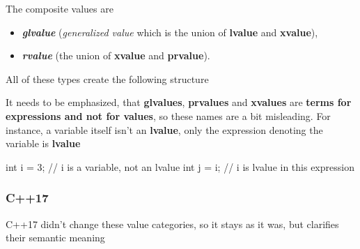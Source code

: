 \documentclass[../main]{subfiles}
\begin{document}
    The composite values are
\begin{itemize}
    \item \textbf{\textit{glvalue}} (\textit{generalized value} which is the union of \textbf{lvalue} and \textbf{xvalue}),
    \item \textbf{\textit{rvalue}} (the union of \textbf{xvalue} and \textbf{prvalue}).
\end{itemize}

    All of these types create the following structure
\begin{center}
\end{center}

    It needs to be emphasized, that \textbf{glvalues}, \textbf{prvalues} and \textbf{xvalues} are \textbf{terms for expressions and not for values}, so these
names are a bit misleading. For instance, a variable itself isn't an \textbf{lvalue}, only the expression denoting the variable is \textbf{lvalue}
\begin{Code}
    int i = 3;  // i is a variable, not an lvalue
    int j = i;  // i is lvalue in this expression
\end{Code}

\subsubsection{C++17}
    C++17 didn't change these value categories, so it stays as it was, but clarifies their semantic meaning
\begin{center}
\end{center}
\end{document}
